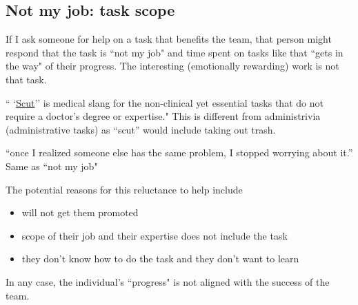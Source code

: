 \subsection{Not my job: task scope}


If I ask someone for help on a task that benefits the team, that person might respond that the task is ``not my job" and time spent on tasks like that ``gets in the way" of their progress. The interesting (emotionally rewarding) work is not that task.

`` `\href{https://www.urbandictionary.com/define.php?term=scut}{Scut}'' is medical slang for the non-clinical yet essential tasks that do not require a doctor's degree or expertise."
This is different from administrivia (administrative tasks) as ``scut'' would include taking out trash. 


``once I realized someone else has the same problem, I stopped worrying about it.'' Same as ``not my job"

The potential reasons for this reluctance to help include
\begin{itemize}
    \item will not get them promoted
    \item scope of their job and their expertise does not include the task
    \item they don't know how to do the task and they don't want to learn
\end{itemize}
In any case, the individual's ``progress" is not aligned with the success of the team.